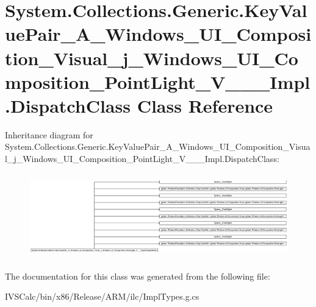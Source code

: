 \hypertarget{class_system_1_1_collections_1_1_generic_1_1_key_value_pair___a___windows___u_i___composition___d37b5df2766b6f1e5bb515df0954f396}{}\section{System.\+Collections.\+Generic.\+Key\+Value\+Pair\+\_\+\+A\+\_\+\+Windows\+\_\+\+U\+I\+\_\+\+Composition\+\_\+\+Visual\+\_\+j\+\_\+\+Windows\+\_\+\+U\+I\+\_\+\+Composition\+\_\+\+Point\+Light\+\_\+\+V\+\_\+\+\_\+\+\_\+\+Impl.\+Dispatch\+Class Class Reference}
\label{class_system_1_1_collections_1_1_generic_1_1_key_value_pair___a___windows___u_i___composition___d37b5df2766b6f1e5bb515df0954f396}
Inheritance diagram for System.\+Collections.\+Generic.\+Key\+Value\+Pair\+\_\+\+A\+\_\+\+Windows\+\_\+\+U\+I\+\_\+\+Composition\+\_\+\+Visual\+\_\+j\+\_\+\+Windows\+\_\+\+U\+I\+\_\+\+Composition\+\_\+\+Point\+Light\+\_\+\+V\+\_\+\+\_\+\+\_\+\+Impl.\+Dispatch\+Class\+:\begin{figure}[H]
\begin{center}
\leavevmode
\includegraphics[height=3.710843cm]{class_system_1_1_collections_1_1_generic_1_1_key_value_pair___a___windows___u_i___composition___d37b5df2766b6f1e5bb515df0954f396}
\end{center}
\end{figure}


The documentation for this class was generated from the following file\+:\begin{DoxyCompactItemize}
\item 
I\+V\+S\+Calc/bin/x86/\+Release/\+A\+R\+M/ilc/Impl\+Types.\+g.\+cs\end{DoxyCompactItemize}
